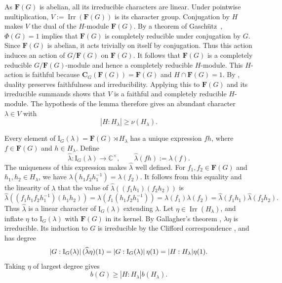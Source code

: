 \documentclass[10pt]{amsart}
\theoremstyle{definition}
\renewcommand{\ge}{\geqslant}
\let\oldendproof\endproof
\renewenvironment{proof}[1][\proofname]{%
  \oldproof[\bfseries #1]%
}{\oldendproof}
\DeclareMathOperator{\Irr}{Irr}
\numberwithin{equation}{section}
\numberwithin{table}{section}
\begin{document}
\begin{proof}
As $\mathbf{F}(G)$ is abelian, all its irreducible characters are linear.
Under pointwise multiplication, $V:=\Irr(\mathbf{F}(G))$ is its character
group. Conjugation by $H$ makes $V$ the dual of the $H$-module
$\mathbf{F}(G)$. By a theorem of Gasch\"utz~\cite[Satz~7]{Gas53}, $\Phi(G)=1$ implies that $\mathbf{F}(G)$ is completely reducible under conjugation by $G$. Since $\mathbf{F}(G)$ is abelian, it acts trivially on itself by conjugation. Thus this action induces an action of $G/\mathbf{F}(G)$ on $\mathbf{F}(G)$. It follows that $\mathbf{F}(G)$ is a completely reducible
$G/\mathbf{F}(G)$-module and hence a completely reducible $H$-module. This $H$-action is faithful because
$\mathbf{C}_G(\mathbf{F}(G))=\mathbf{F}(G)$ and
$H\cap\mathbf{F}(G)=1$. By \cite[Proposition~12.1]{ManzWolf93}, duality preserves faithfulness and irreducibility. Applying this to $\mathbf{F}(G)$ and its irreducible summands shows that $V$ is a faithful and completely reducible $H$-module. The hypothesis of the lemma
therefore gives an abundant character $\lambda\in V$ with
\begin{equation}\label{pn-stabiliser-ineq}
    |H:H_\lambda|\ge \nu(H_\lambda).
\end{equation}

Every element of
$\mathrm I_G(\lambda)=\mathbf{F}(G)\rtimes H_\lambda$
has a unique expression $fh$, where $f\in\mathbf{F}(G)$ and
$h\in H_\lambda$. Define
$$
\widehat{\lambda}\colon \mathrm I_G(\lambda)\longrightarrow\mathbb C^\times,
\qquad
\widehat{\lambda}(fh):=\lambda(f).
$$
The uniqueness of this expression makes $\widehat{\lambda}$ well defined.
For $f_1,f_2\in\mathbf{F}(G)$ and $h_1,h_2\in H_\lambda$, we have
$\lambda(h_1f_2h_1^{-1})=\lambda(f_2)$.
It follows from this equality and the linearity of $\lambda$ that the value of
$\widehat{\lambda}((f_1h_1)(f_2h_2))$ is
$$
\widehat{\lambda}((f_1h_1f_2h_1^{-1})(h_1h_2))
 =\lambda(f_1(h_1f_2h_1^{-1}))
 =\lambda(f_1)\lambda(f_2)
 =\widehat{\lambda}(f_1h_1)\widehat{\lambda}(f_2h_2).
$$
Thus $\widehat{\lambda}$ is a linear character of
$\mathrm I_G(\lambda)$ extending $\lambda$. Let $\eta\in\Irr(H_\lambda)$, and inflate $\eta$ to
$\mathrm I_G(\lambda)$ with $\mathbf{F}(G)$ in its kernel. By Gallagher's theorem \cite[Corollary~6.17]{Isa76}, $\widehat{\lambda}\eta$ is irreducible. Its induction to $G$ is irreducible by the
Clifford correspondence \cite[Theorem~6.11]{Isa76}, and has degree
$$
 |G:{\rm I}_G(\lambda)|\,(\widehat{\lambda}\eta)(1)=|G:{\rm I}_G(\lambda)|\,\eta(1)=|H:H_\lambda|\eta(1).
$$
Taking $\eta$ of largest degree gives
\begin{equation}\label{lambda-degree-bound}
    b(G)\ge |H:H_\lambda|b(H_\lambda).
\end{equation}


\end{proof}
\end{document}
